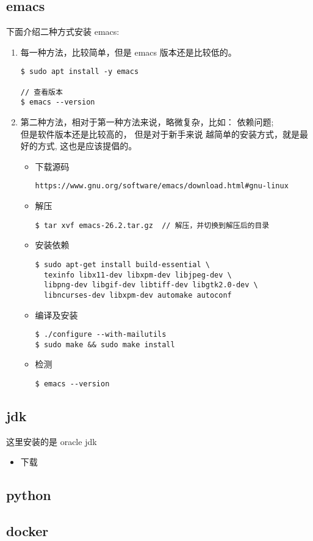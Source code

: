 \subsection{emacs}
下面介绍二种方式安装 emacs:
\flushleft
\begin{enumerate}
\item 每一种方法，比较简单，但是 emacs 版本还是比较低的。
\begin{lstlisting}
$ sudo apt install -y emacs 

// 查看版本
$ emacs --version  
\end{lstlisting}

\item 第二种方法，相对于第一种方法来说，略微复杂，比如： 依赖问题; \\
但是软件版本还是比较高的， 但是对于新手来说 越简单的安装方式，就是最好的方式, 
这也是应该提倡的。

\begin{itemize}
\item 下载源码 \\ 
\begin{verbatim}
https://www.gnu.org/software/emacs/download.html#gnu-linux
\end{verbatim}

\item 解压
\begin{verbatim}  
$ tar xvf emacs-26.2.tar.gz  // 解压，并切换到解压后的目录
\end{verbatim}

\item 安装依赖
\begin{verbatim}  
$ sudo apt-get install build-essential \
  texinfo libx11-dev libxpm-dev libjpeg-dev \
  libpng-dev libgif-dev libtiff-dev libgtk2.0-dev \
  libncurses-dev libxpm-dev automake autoconf 
\end{verbatim}

\item 编译及安装
\begin{verbatim}  
$ ./configure --with-mailutils 
$ sudo make && sudo make install  
\end{verbatim}

\item 检测
\begin{verbatim}
$ emacs --version
\end{verbatim}

\end{itemize}
\end{enumerate}
\newpage

\subsection{jdk}
这里安装的是 oracle jdk

\flushleft
\begin{enumerate}
\begin{itemize}
\item 下载 
 
\end{itemize}
\end{enumerate}

\subsection{python}
\subsection{docker}